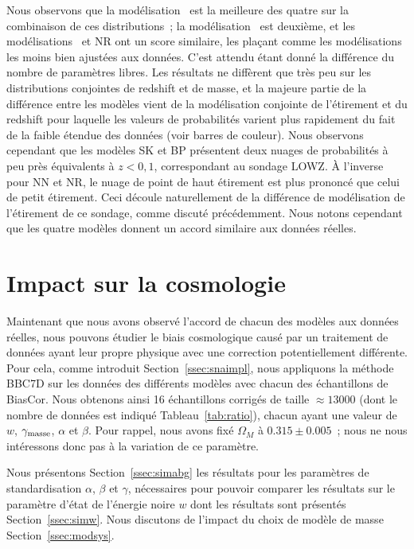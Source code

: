 \documentclass[../main/main.tex]{subfiles}
\begin{document}
Nous observons que la modélisation~ est la meilleure des
quatre sur la combinaison de ces distributions~; la
modélisation~ est deuxième, et les
modélisations~ et NR ont un score similaire, les plaçant
comme les modélisations les moins bien ajustées aux données. C'est attendu étant
donné la différence du nombre de paramètres libres. Les résultats ne diffèrent
que très peu sur les distributions conjointes de redshift et de masse, et la
majeure partie de la différence entre les modèles vient de la modélisation
conjointe de l'étirement et du redshift pour laquelle les valeurs de
probabilités varient plus rapidement du fait de la faible étendue des données
(voir barres de couleur). Nous observons cependant que les modèles SK et BP
présentent deux nuages de probabilités à peu près équivalents à $z < 0,1$,
correspondant au sondage LOWZ. À l'inverse pour NN et NR, le nuage de point de
haut étirement est plus prononcé que celui de petit étirement. Ceci découle
naturellement de la différence de modélisation de l'étirement de ce sondage,
comme discuté précédemment. Nous notons cependant que les quatre modèles donnent
un accord similaire aux données réelles.

\section{Impact sur la cosmologie}\label{sec:simres}

Maintenant que nous avons observé l'accord de chacun des modèles aux données
réelles, nous pouvons étudier le biais cosmologique causé par un traitement de
données ayant leur propre physique avec une correction potentiellement
différente. Pour cela, comme introduit Section~\ref{ssec:snaimpl}, nous
appliquons la méthode BBC7D \citep[][voir
Section~\ref{ssec:bbc7D}]{popovic2021a} sur les données des différents modèles
avec chacun des échantillons de BiasCor. Nous obtenons ainsi 16 échantillons
corrigés de taille $\approx \num{13000}$ (dont le nombre de données est indiqué
Tableau~\ref{tab:ratio}), chacun ayant une valeur de $w$, $\gamma_{\rm masse}$,
$\alpha$ et $\beta$. Pour rappel, nous avons fixé $\Omega_M$ à
$\num{0.315}\pm\num{0.005}$~; nous ne nous intéressons donc pas à la variation
de ce paramètre.

Nous présentons Section~\ref{ssec:simabg} les résultats pour les paramètres de
standardisation $\alpha$, $\beta$ et $\gamma$, nécessaires pour pouvoir comparer
les résultats sur le paramètre d'état de l'énergie noire $w$ dont les résultats
sont présentés Section~\ref{ssec:simw}. Nous discutons de l'impact du choix de
modèle de masse Section~\ref{ssec:modsys}.
\end{document}
